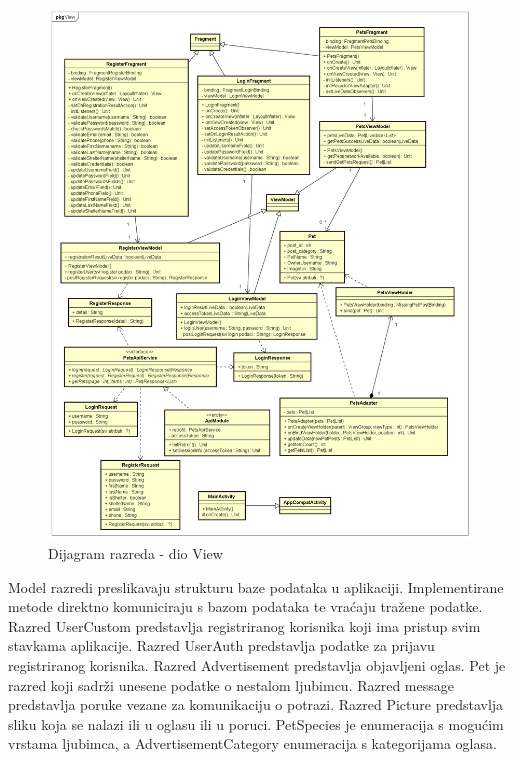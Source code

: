 			\begin{figure}[H]
				\includegraphics[scale=0.45]{dijagrami/dijagramiRazreda/View.PNG} %
				\centering
				\caption{Dijagram razreda - dio View}
				\label{fig:drView}
			\end{figure}

			Model razredi preslikavaju strukturu baze podataka u aplikaciji. Implementirane metode direktno komuniciraju s bazom podataka te vraćaju tražene podatke. Razred UserCustom predstavlja registriranog korisnika koji ima pristup svim stavkama aplikacije. Razred UserAuth predstavlja podatke za prijavu registriranog korisnika. Razred Advertisement predstavlja objavljeni oglas. Pet je razred koji sadrži unesene podatke o nestalom ljubimcu. Razred message predstavlja poruke vezane za komunikaciju o potrazi. Razred Picture predstavlja sliku koja se nalazi ili u oglasu ili u poruci. PetSpecies je enumeracija s mogućim vrstama ljubimca, a AdvertisementCategory enumeracija s kategorijama oglasa.

